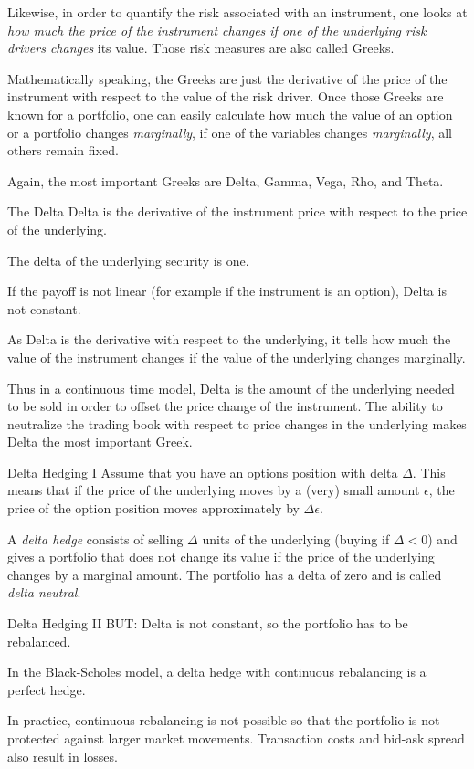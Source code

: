 	Likewise, in order to quantify the risk associated with an instrument, one looks at
	\emph{ how much the price of the instrument changes if one of the underlying
	risk drivers changes} its value. Those risk measures are also called
	Greeks.
	
	Mathematically speaking, the Greeks are just the derivative of the price
	of the instrument with respect to the value of the risk driver.
	Once those Greeks are known for a portfolio, one can easily calculate how
	much the value of an option or a portfolio changes \emph{marginally}, if one of
	the variables changes \emph{marginally}, all others remain fixed.
	
	Again, the most important Greeks are Delta, Gamma, Vega, Rho, and Theta.


The Delta
	Delta is the derivative of the instrument price with respect to the price
	of the underlying.
	
	The delta of the underlying security is one.
	
	If the payoff is not linear (for example if the instrument is an option),
	Delta is not constant.
	
	As Delta is the derivative with respect to the underlying, it tells how
	much the value of the instrument changes if the value of the underlying changes
	marginally.
	
	Thus in a continuous time model, Delta is the amount of the underlying
	needed to be sold in order to offset the price change of the instrument. The
	ability to neutralize the trading book with respect to price changes in the
	underlying makes Delta the most important Greek.


Delta Hedging I
	Assume that you have an options position with delta $\Delta$. This means
  that if the price of the underlying moves by a (very) small amount $\epsilon$, the
  price of the option position moves approximately by $\Delta \epsilon$.
  
	A \emph{delta hedge} consists of selling $\Delta$ units of the
  underlying (buying if $\Delta <0$) and gives a portfolio that does not
  change its value if the price of the underlying changes by a marginal amount.
  The portfolio has a delta of zero and is called \emph{delta neutral}.


Delta Hedging II
	BUT: Delta is not constant, so the portfolio has to be rebalanced.
  
	In the Black-Scholes model, a delta hedge with continuous rebalancing is
  a perfect hedge.
  
	In practice, continuous rebalancing is not possible so that the
  portfolio is not protected against larger market movements. Transaction
  costs and bid-ask spread also result in losses.


